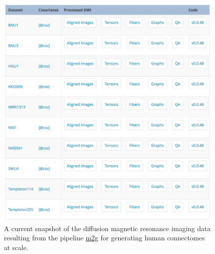 \documentclass[simplex.tex]{subfiles}
\begin{document}

\begin{figure}[h!]
\begin{cframed}
\centering
\includegraphics[height=0.65\textheight]{../../figs/DiffusionMRI_data201704.png}
\caption{A current snapshot of the diffusion magnetic resonance imaging data resulting from the pipeline \href{http://m2g.io}{m2g} for generating human connectomes at scale.}
\label{fig:dmri_data201704}
\end{cframed}
\end{figure}

\clearpage
\end{document}
